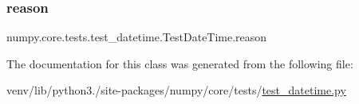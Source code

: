 \subsubsection{\texorpdfstring{reason}{reason}}
{\footnotesize\ttfamily numpy.\+core.\+tests.\+test\+\_\+datetime.\+Test\+Date\+Time.\+reason\hspace{0.3cm}{\ttfamily [static]}}



The documentation for this class was generated from the following file\+:\begin{DoxyCompactItemize}
\item 
venv/lib/python3./site-\/packages/numpy/core/tests/\hyperlink{test__datetime_8py}{test\+\_\+datetime.\+py}\end{DoxyCompactItemize}

